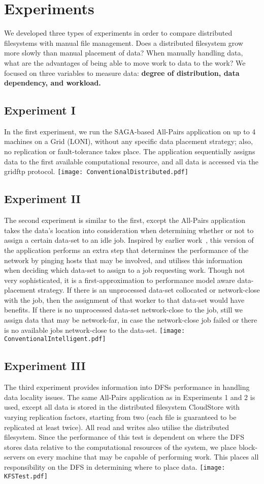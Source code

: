 \documentclass{rspublic}
\begin{document}
\section{Experiments} We developed three types of experiments
in order to compare distributed filesystems with manual file management.
Does a distributed filesystem grow more slowly than manual placement of
data?  When manually handling data, what are the advantages of being able
to move work to data to the work?  We focused on three variables to 
measure data:  \bf{degree of distribution, data dependency, and
workload.}

\subsection{Experiment I} In the first experiment, we run the SAGA-based
All-Pairs application on up to 4 machines on a Grid (LONI), without any
specific data placement strategy; also, no replication or
fault-tolerance takes place. The application sequentially assigns data
to the first available computational resource, and all data is accessed
via the gridftp protocol.
\texttt{[image: ConventionalDistributed.pdf]}
\subsection{Experiment II} The second experiment is similar to the
first, except the All-Pairs application takes the data's location into
consideration when determining whether or not to assign a certain
data-set to an idle job. Inspired by earlier work~\citep{netperf}, this
version of the application performs an extra step that determines the
performance of the network by pinging hosts that may be involved, and
utilises this information when deciding which data-set to assign to a
job requesting work. Though not very sophisticated, it is a
first-approximation to performance model aware data-placement strategy.
If there is an unprocessed data-set collocated or network-close with the
job, then the assignment of that worker to that data-set would have
benefits. If there is no unprocessed data-set network-close to the job,
still we assign data that may be network-far, in case the network-close
job failed or there is no available jobs network-close to the data-set.
\texttt{[image: ConventionalIntelligent.pdf]}
\subsection{Experiment III} The third experiment provides information
into DFSs performance in handling data locality issues. The same
All-Pairs application as in Experiments 1 and 2 is used, except all data
is stored in the distributed filesystem CloudStore with varying
replication factors, starting from two (each file is guaranteed to be
replicated at least twice). All read and writes also utilise the
distributed filesystem.  Since the performance of this test is dependent
on where the DFS stores data relative to the computational resources of
the system, we place block-servers on every machine that may be capable
of performing work.  This places all responsibility on the DFS in
determining where to place data.
\texttt{[image: KFSTest.pdf]}
\end{document}
